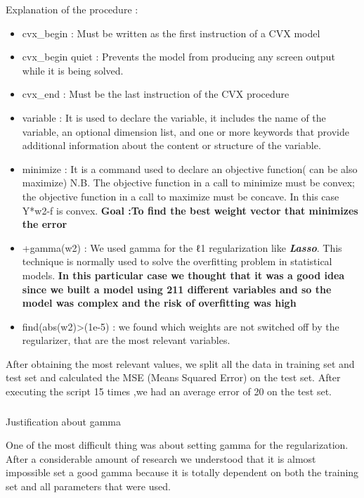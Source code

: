 Explanation of the procedure : 

\begin{itemize}
\item cvx\_begin : Must be written as the first instruction of a CVX model
\item cvx\_begin quiet : Prevents the model from producing any screen output while it is being solved.
\item cvx\_end : Must be the last instruction of the CVX procedure 
\item variable : It is used to declare the variable, it includes the name of the variable, an optional dimension list, and one or more keywords that provide additional information about the content or structure of the variable.
\item minimize : It is a command used to declare an objective function( can be also maximize) 
N.B. The objective function in a call to minimize must be convex; the objective function in a call to maximize must be concave. In this case Y*w2-f is convex.
\textbf{Goal :To find the best weight vector that minimizes the error }
\item +gamma(w2) : We used gamma for the ℓ1 regularization like \textit{\textbf{Lasso}}. This technique is normally used to solve the overfitting problem in statistical models. \textbf{In this particular case we thought that it was a good idea since we built a model using 211 different variables and so the model was complex and the risk of overfitting was high}
\item find(abs(w2)\textgreater(1e-5) : we found which weights are not switched off by the regularizer, that are the most relevant variables. 
\end{itemize}

After obtaining the most relevant values, we split all the data in training set and test set and calculated the MSE (Means Squared Error) on the test set. After executing the script 15 times ,we had an average error of 20 on the test set\cite{rossi2013exchange}. 


\subsubsection{}{Justification about gamma \\}

One of the most difficult thing was about setting gamma for the regularization. After a considerable amount of research we understood that it is almost impossible set a good gamma because it is totally dependent on both the training set and all parameters that were used\cite{philip2011artificial}. 

